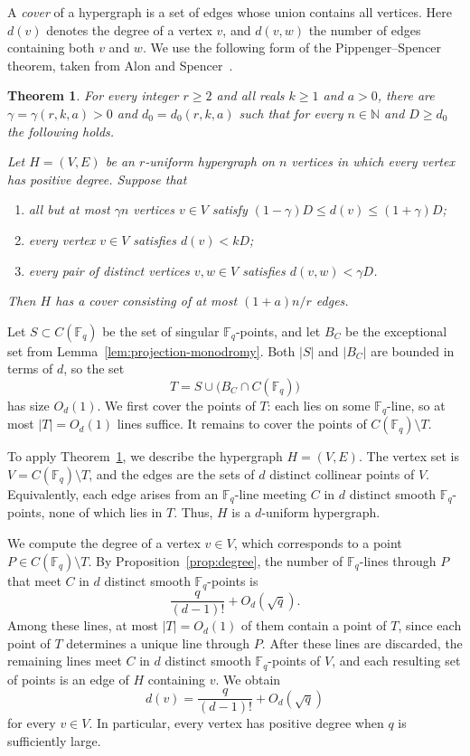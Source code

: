 \documentclass[12pt,reqno]{amsart}
\newtheorem{theorem}{Theorem}[section]
\theoremstyle{definition}
\theoremstyle{remark}
\newcommand{\Fq}{\mathbb{F}_q}
\begin{document}
A \emph{cover} of a hypergraph is a set of edges whose union contains all vertices. Here $d(v)$ denotes the degree of a vertex $v$, and $d(v,w)$ the number of edges containing both $v$ and $w$. We use the following form of the Pippenger--Spencer theorem, taken from Alon and Spencer~\cite[Theorem~4.7.1]{AS16}.

\begin{theorem}\label{thm:pippenger-spencer}
For every integer $r \geq 2$ and all reals $k \geq 1$ and $a > 0$, there are $\gamma=\gamma(r,k,a)>0$ and
$d_0=d_0(r,k,a)$ such that for every $n\in\mathbb{N}$ and $D \geq d_0$ the following holds.

Let $H=(V,E)$ be an $r$-uniform hypergraph on $n$ vertices in which every vertex has positive degree. Suppose that
\begin{enumerate}
    \item all but at most $\gamma n$ vertices $v\in V$ satisfy $(1-\gamma)D\leq d(v)\leq (1+\gamma)D$;
    \item every vertex $v\in V$ satisfies $d(v)<kD$;
    \item every pair of distinct vertices $v,w\in V$ satisfies $d(v,w)<\gamma D$.
\end{enumerate}
Then $H$ has a cover consisting of at most $(1+a)n/r$ edges.
\end{theorem}

Let $S\subset C(\Fq)$ be the set of singular $\Fq$-points, and let $B_C$ be the exceptional set from Lemma~\ref{lem:projection-monodromy}. Both $|S|$ and $|B_C|$ are bounded in terms of $d$, so the set
\[
T=S\cup\bigl(B_C\cap C(\Fq)\bigr)
\]
has size $O_d(1)$. We first cover the points of $T$: each lies on some $\Fq$-line, so at most $|T|=O_d(1)$ lines suffice. It remains to cover the points of $C(\Fq)\setminus T$.

To apply Theorem~\ref{thm:pippenger-spencer}, we describe the hypergraph $H=(V,E)$. The vertex set is $V=C(\Fq)\setminus T$, and the edges are the sets of $d$ distinct collinear points of $V$. Equivalently, each edge arises from an $\Fq$-line meeting $C$ in $d$ distinct smooth $\Fq$-points, none of which lies in $T$. Thus, $H$ is a $d$-uniform hypergraph.

We compute the degree of a vertex $v\in V$, which corresponds to a point $P\in C(\Fq)\setminus T$. By Proposition~\ref{prop:degree}, the number of $\Fq$-lines through $P$ that meet $C$ in $d$ distinct smooth $\Fq$-points is
\[
\frac{q}{(d-1)!}+O_d(\sqrt q).
\]
Among these lines, at most $|T|=O_d(1)$ of them contain a point of $T$, since each point of $T$ determines a unique line through $P$. After these lines are discarded, the remaining lines meet $C$ in $d$
distinct smooth $\Fq$-points of $V$, and each resulting set of points
is an edge of $H$ containing $v$. We obtain
\begin{equation}\label{eq:degree-of-a-vertex}
d(v)=\frac{q}{(d-1)!}+O_d(\sqrt q)
\end{equation}
for every $v\in V$. In particular, every vertex has positive degree when $q$ is sufficiently large.
\end{document}
